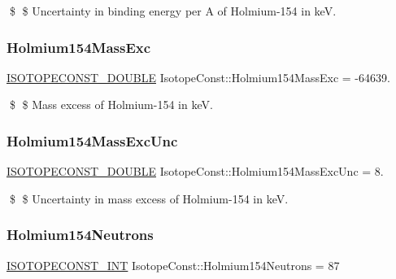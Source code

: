 \$ \$ Uncertainty in binding energy per A of Holmium-\/154 in keV. \mbox{\label{group___isotope_const-_holmium-_ho154_gadcc2bd059e275e06ccf13238b2fa8fa0}} 
\subsubsection{\texorpdfstring{Holmium154\+Mass\+Exc}{Holmium154MassExc}}
{\footnotesize\ttfamily \mbox{\hyperlink{group___isotope_const-_macros_ga8f45a7272ce02c0b4c65c44636ed719a}{I\+S\+O\+T\+O\+P\+E\+C\+O\+N\+S\+T\+\_\+\+D\+O\+U\+B\+LE}} Isotope\+Const\+::\+Holmium154\+Mass\+Exc = -\/64639.}

\$ \$ Mass excess of Holmium-\/154 in keV. \mbox{\label{group___isotope_const-_holmium-_ho154_gafd3165c862d21485754dd242e98b16ef}} 
\subsubsection{\texorpdfstring{Holmium154\+Mass\+Exc\+Unc}{Holmium154MassExcUnc}}
{\footnotesize\ttfamily \mbox{\hyperlink{group___isotope_const-_macros_ga8f45a7272ce02c0b4c65c44636ed719a}{I\+S\+O\+T\+O\+P\+E\+C\+O\+N\+S\+T\+\_\+\+D\+O\+U\+B\+LE}} Isotope\+Const\+::\+Holmium154\+Mass\+Exc\+Unc = 8.}

\$ \$ Uncertainty in mass excess of Holmium-\/154 in keV. \mbox{\label{group___isotope_const-_holmium-_ho154_ga29e15070a723438b893b09983f803de7}} 
\subsubsection{\texorpdfstring{Holmium154\+Neutrons}{Holmium154Neutrons}}
{\footnotesize\ttfamily \mbox{\hyperlink{group___isotope_const-_macros_ga5f18360b3e99483a35c32d789e62621c}{I\+S\+O\+T\+O\+P\+E\+C\+O\+N\+S\+T\+\_\+\+I\+NT}} Isotope\+Const\+::\+Holmium154\+Neutrons = 87}

